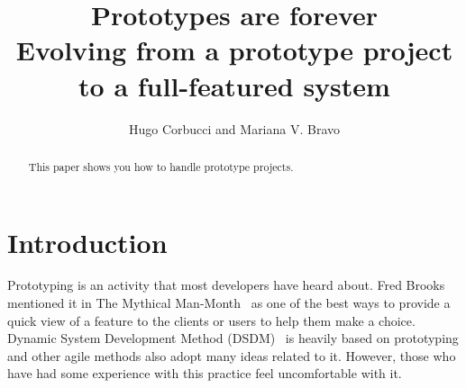 \documentclass[lnbip]{svmultln}
\begin{document}
%
\mainmatter              %
%
\title{Prototypes are forever\\
  Evolving from a prototype project\\ to a full-featured system}
%
%
\author{Hugo Corbucci and Mariana V. Bravo }
%
%
%

\maketitle              %

\begin{abstract}        %

This paper shows you how to handle prototype projects.

\end{abstract}
%
\section{Introduction}

Prototyping is an activity that most developers have heard about. Fred
Brooks mentioned it in The Mythical Man-Month~\cite{Brooks1975} as one
of the best ways to provide a quick view of a feature to the clients
or users to help them make a choice. Dynamic System Development Method
(DSDM)~\cite{DSDM} is heavily based on prototyping and other agile
methods also adopt many ideas related to it. However, those who have
had some experience with this practice feel uncomfortable with it.
\end{document}
